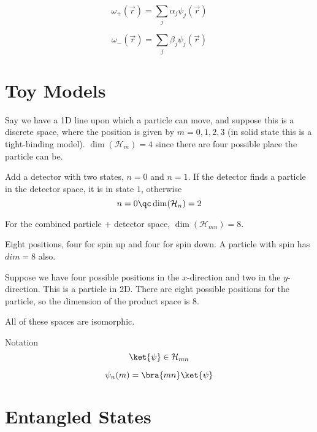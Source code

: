 \documentclass[a4paper,twoside,master.tex]{subfiles}
\begin{document}
\begin{equation}
\omega_+(\vec{r}) = \sum_j\alpha_j\psi_j(\vec{r})
\end{equation}

\begin{equation}
\omega_-(\vec{r}) = \sum_j\beta_j\psi_j(\vec{r})
\end{equation}

\section{Toy Models}
\label{sec:toy_models}


\begin{ex}

    Say we have a 1D line upon which a particle can move, and suppose this
is a discrete space, where the position is given by $m=0,1,2,3$ (in
solid state this is a tight-binding model). $\dim(\mathcal{H}_m) = 4$
since there are four possible place the particle can be.

Add a detector with two states, $n=0$ and $n=1$. If the detector
finds a particle in the detector space, it is in state $1$, otherwise
\begin{equation}
    n=0 \qc \dim(\mathcal{H}_n) = 2
\end{equation}

For the combined particle + detector space,
$\dim(\mathcal{H}_{mn}) = 8$.
\end{ex}
\begin{ex}
Eight positions, four for spin up and four for spin down. A particle
with spin has $dim = 8$ also.
\end{ex}
\begin{ex}
Suppose we have four possible positions in the $x$-direction and two
in the $y$-direction. This is a particle in 2D. There are eight
possible positions for the particle, so the dimension of the product
space is $8$.

All of these spaces are isomorphic.
\end{ex}
\begin{note}{Notation}
\begin{equation}
\ket{\psi}\in\mathcal{H}_{mn}
\end{equation}

\begin{equation}
\psi_n(m) = \bra{ mn}\ket{\psi}
\end{equation}
\end{note}

\section{Entangled States}
\label{sec:entangled_states}
\end{document}
